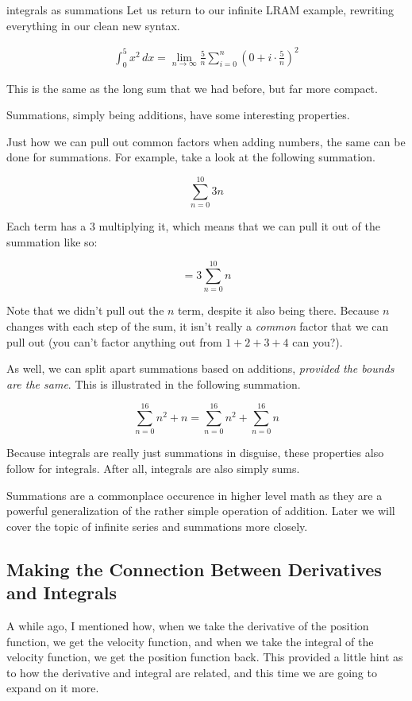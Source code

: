 \begin{example}{integrals as summations}
    Let us return to our infinite LRAM example, rewriting everything in our clean new syntax.

    \begin{align*}
        \int_{ 0 }^{ 5 } x^2 \, dx = \lim_{n \to \infty} \frac{5}{n} \sum_{i = 0}^{n} \left( 0 + i \cdot \frac{5}{n} \right)^2
    \end{align*}

    This is the same as the long sum that we had before, but far more compact.
\end{example}

Summations, simply being additions, have some interesting properties.

Just how we can pull out common factors when adding numbers, the same can be done for summations. For example, take a look at the following summation.

\[
    \sum_{n = 0}^{10} 3 n
\]

Each term has a \( 3 \) multiplying it, which means that we can pull it out of the summation like so:

\[
    = 3 \sum_{n = 0}^{10} n
\]

Note that we didn't pull out the \( n \) term, despite it also being there. Because \( n \) changes with each step of the sum, it isn't really a \textit{common} factor that we can pull out (you can't factor anything out from \( 1 + 2 + 3 + 4 \) can you?).

As well, we can split apart summations based on additions, \textit{provided the bounds are the same}. This is illustrated in the following summation.

\[
    \sum_{n = 0}^{16} n^2 + n = \sum_{n = 0}^{16} n^2 + \sum_{n = 0}^{16} n
\]

Because integrals are really just summations in disguise, these properties also follow for integrals. After all, integrals are also simply sums.

Summations are a commonplace occurence in higher level math as they are a powerful generalization of the rather simple operation of addition. Later we will cover the topic of infinite series and summations more closely.

\subsection{Making the Connection Between Derivatives and Integrals}

A while ago, I mentioned how, when we take the derivative of the position function, we get the velocity function, and when we take the integral of the velocity function, we get the position function back. This provided a little hint as to how the derivative and integral are related, and this time we are going to expand on it more.


